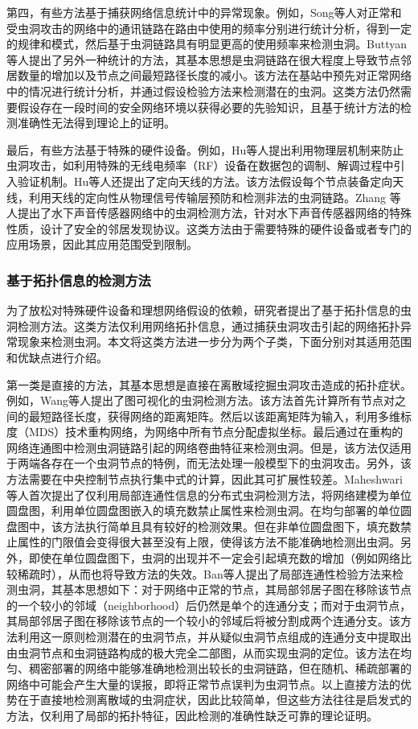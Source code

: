 第四，有些方法基于捕获网络信息统计中的异常现象。例如，Song等人对正常和受虫洞攻击的网络中的通讯链路在路由中使用的频率分别进行统计分析，得到一定的规律和模式，然后基于虫洞链路具有明显更高的使用频率来检测虫洞。Buttyan等人提出了另外一种统计的方法，其基本思想是虫洞链路在很大程度上导致节点邻居数量的增加以及节点之间最短路径长度的减小。该方法在基站中预先对正常网络中的情况进行统计分析，并通过假设检验方法来检测潜在的虫洞。这类方法仍然需要假设存在一段时间的安全网络环境以获得必要的先验知识，且基于统计方法的检测准确性无法得到理论上的证明。

最后，有些方法基于特殊的硬件设备。例如，Hu等人提出利用物理层机制来防止虫洞攻击，如利用特殊的无线电频率（RF）设备在数据包的调制、解调过程中引入验证机制。Hu等人还提出了定向天线的方法。该方法假设每个节点装备定向天线，利用天线的定向性从物理信号传输层预防和检测非法的虫洞链路。Zhang 等人提出了水下声音传感器网络中的虫洞检测方法，针对水下声音传感器网络的特殊性质，设计了安全的邻居发现协议。这类方法由于需要特殊的硬件设备或者专门的应用场景，因此其应用范围受到限制。
\subsubsection{基于拓扑信息的检测方法}
为了放松对特殊硬件设备和理想网络假设的依赖，研究者提出了基于拓扑信息的虫洞检测方法。这类方法仅利用网络拓扑信息，通过捕获虫洞攻击引起的网络拓扑异常现象来检测虫洞。本文将这类方法进一步分为两个子类，下面分别对其适用范围和优缺点进行介绍。

第一类是直接的方法，其基本思想是直接在离散域挖掘虫洞攻击造成的拓扑症状。例如，Wang等人提出了图可视化的虫洞检测方法。该方法首先计算所有节点对之间的最短路径长度，获得网络的距离矩阵。然后以该距离矩阵为输入，利用多维标度（MDS）技术重构网络，为网络中所有节点分配虚拟坐标。最后通过在重构的网络连通图中检测虫洞链路引起的网络卷曲特征来检测虫洞。但是，该方法仅适用于两端各存在一个虫洞节点的特例，而无法处理一般模型下的虫洞攻击。另外，该方法需要在中央控制节点执行集中式的计算，因此其可扩展性较差。Maheshwari等人首次提出了仅利用局部连通性信息的分布式虫洞检测方法，将网络建模为单位圆盘图，利用单位圆盘图嵌入的填充数禁止属性来检测虫洞。在均匀部署的单位圆盘图中，该方法执行简单且具有较好的检测效果。但在非单位圆盘图下，填充数禁止属性的门限值会变得很大甚至没有上限，使得该方法不能准确地检测出虫洞。另外，即使在单位圆盘图下，虫洞的出现并不一定会引起填充数的增加（例如网络比较稀疏时），从而也将导致方法的失效。Ban等人提出了局部连通性检验方法来检测虫洞，其基本思想如下：对于网络中正常的节点，其局部邻居子图在移除该节点的一个较小的邻域（neighborhood）后仍然是单个的连通分支；而对于虫洞节点，其局部邻居子图在移除该节点的一个较小的邻域后将被分割成两个连通分支。该方法利用这一原则检测潜在的虫洞节点，并从疑似虫洞节点组成的连通分支中提取出由虫洞节点和虫洞链路构成的极大完全二部图，从而实现虫洞的定位。该方法在均匀、稠密部署的网络中能够准确地检测出较长的虫洞链路，但在随机、稀疏部署的网络中可能会产生大量的误报，即将正常节点误判为虫洞节点。以上直接方法的优势在于直接地检测离散域的虫洞症状，因此比较简单，但这些方法往往是启发式的方法，仅利用了局部的拓扑特征，因此检测的准确性缺乏可靠的理论证明。

